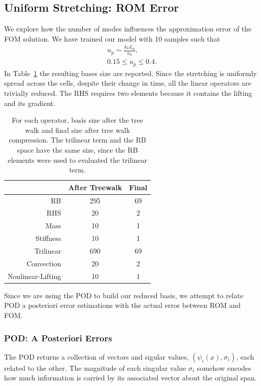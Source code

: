 \documentclass[../../thesis.tex]{subfiles}
\begin{document}
\subsection{Uniform Stretching: ROM Error}
\label{sec:hrom_results_reduced_basis}
We explore how the number of modes influences the approximation error of the FOM solution.
We have trained our model with 10 samples such that
\begin{align*}
    u_p \sim \frac{\delta \omega L_0}{a_0},
    \nonumber
    \\
    0.15 \leq u_p \leq 0.4.
\end{align*}
In Table~\ref{tab:uniform_stretching_basis_size} the resulting bases size are reported.
Since the stretching is uniformly spread across the cells, despite their change in time,
all the linear operators are trivially reduced.
The RHS requires two elements because it contains the lifting and its gradient.
\begin{table}[!h]
    \caption{For each operator,
    basis size after the tree walk and final size after tree walk compression.
    The trilinear term and the RB space have the same size, 
    since the RB elements were used to evaluated the trilinear term.}
    \centering
    \begin{tabular}{@{}rcc@{}}
    \toprule
                      & After Treewalk & Final \\ \midrule
    RB                & 295            & 69                \\
    RHS               & 20             & 2                 \\
    Mass              & 10             & 1                 \\
    Stiffness         & 10             & 1                 \\
    Trilinear         & 690            & 69                \\
    Convection        & 20             & 2                 \\
    Nonlinear-Lifting & 10             & 1                 \\ \bottomrule
    \end{tabular}
    \label{tab:uniform_stretching_basis_size}
\end{table}
Since we are using the POD to build our reduced basis, 
we attempt to relate POD a posteriori error estimations with 
the actual error between ROM and FOM.

\subsubsection{POD: A Posteriori Errors}
The POD returns a collection of vectors and sigular values, 
$(\psi_i(x), \sigma_i)$,
each related to the other.
The magnitude of each singular value $\sigma_i$ somehow encodes 
how much information is carried by its associated vector about the original span.
\end{document}
